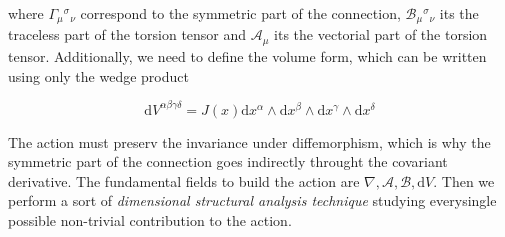 \documentclass[10pt,a4paper]{article}
\begin{document}
where $\Gamma_{\mu}{}^{\sigma}{}_{\nu}$ correspond to the symmetric part of the connection, $\mathcal{B}_{\mu}{}^{\sigma}{}_{\nu}$ its the traceless
part of the torsion tensor and $\mathcal{A}_{\mu}$ its the vectorial part of the torsion tensor. Additionally, we need to define the volume
form, which can be written using only the wedge product

\begin{equation}
  \mathrm{d}V^{\alpha\beta\gamma\delta} = J(x)\mathrm{d}x^{\alpha}\wedge\mathrm{d}x^{\beta}\wedge\mathrm{d}x^{\gamma}\wedge\mathrm{d}x^{\delta}
\end{equation}

The action must preserv the invariance under diffemorphism, which is why the symmetric part of the connection goes indirectly throught the 
covariant derivative. The fundamental fields to build the action are $\nabla, \mathcal{A}, \mathcal{B}, \mathrm{d}V$. Then we perform a sort
of \textit{dimensional structural analysis technique} studying everysingle possible non-trivial contribution to the action.
\end{document}
